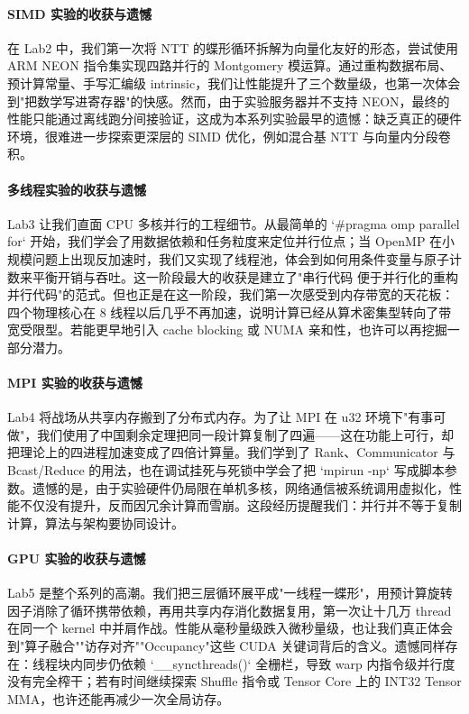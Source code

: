 \documentclass[a4paper]{article}
\begin{document}
\paragraph{SIMD 实验的收获与遗憾} 在 Lab2 中，我们第一次将 NTT 的蝶形循环拆解为向量化友好的形态，尝试使用 ARM NEON 指令集实现四路并行的 Montgomery 模运算。通过重构数据布局、预计算常量、手写汇编级 intrinsic，我们让性能提升了三个数量级，也第一次体会到"把数学写进寄存器"的快感。然而，由于实验服务器并不支持 NEON，最终的性能只能通过离线跑分间接验证，这成为本系列实验最早的遗憾：缺乏真正的硬件环境，很难进一步探索更深层的 SIMD 优化，例如混合基 NT​T 与向量内分段卷积。

\paragraph{多线程实验的收获与遗憾} Lab3 让我们直面 CPU 多核并行的工程细节。从最简单的 `#pragma omp parallel for` 开始，我们学会了用数据依赖和任务粒度来定位并行位点；当 OpenMP 在小规模问题上出现反加速时，我们又实现了线程池，体会到如何用条件变量与原子计数来平衡开销与吞吐。这一阶段最大的收获是建立了"串行代码 \rightarrow 便于并行化的重构 \rightarrow 并行代码"的范式。但也正是在这一阶段，我们第一次感受到内存带宽的天花板：四个物理核心在 8 线程以后几乎不再加速，说明计算已经从算术密集型转向了带宽受限型。若能更早地引入 cache blocking 或 NUMA 亲和性，也许可以再挖掘一部分潜力。

\paragraph{MPI 实验的收获与遗憾} Lab4 将战场从共享内存搬到了分布式内存。为了让 MPI 在 u32 环境下"有事可做"，我们使用了中国剩余定理把同一段计算复制了四遍——这在功能上可行，却把理论上的四进程加速变成了四倍计算量。我们学到了 Rank、Communicator 与 Bcast/Reduce 的用法，也在调试挂死与死锁中学会了把 `mpirun -np` 写成脚本参数。遗憾的是，由于实验硬件仍局限在单机多核，网络通信被系统调用虚拟化，性能不仅没有提升，反而因冗余计算而雪崩。这段经历提醒我们：并行并不等于复制计算，算法与架构要协同设计。

\paragraph{GPU 实验的收获与遗憾} Lab5 是整个系列的高潮。我们把三层循环展平成"一线程一蝶形"，用预计算旋转因子消除了循环携带依赖，再用共享内存消化数据复用，第一次让十几万 thread 在同一个 kernel 中并肩作战。性能从毫秒量级跌入微秒量级，也让我们真正体会到"算子融合""访存对齐""Occupancy"这些 CUDA 关键词背后的含义。遗憾同样存在：线程块内同步仍依赖 `__syncthreads()` 全栅栏，导致 warp 内指令级并行度没有完全榨干；若有时间继续探索 Shuffle 指令或 Tensor Core 上的 INT32 Tensor MMA，也许还能再减少一次全局访存。
\end{document}
